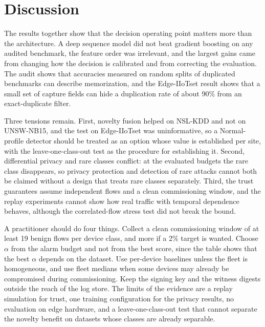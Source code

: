 \documentclass[journal]{IEEEtran}
\begin{document}
\begin{table}[t]
\centering
\caption{Per-round cost on one CPU thread.}
\label{tab:latency}
\scriptsize
\setlength{\tabcolsep}{2pt}
\resizebox{\columnwidth}{!}{}
\end{table}

\section{Discussion}\label{sec:discussion}
The results together show that the decision operating point matters more than the architecture. A deep sequence model did not beat gradient boosting on any audited benchmark, the feature order was irrelevant, and the largest gains came from changing how the decision is calibrated and from correcting the evaluation. The audit shows that accuracies measured on random splits of duplicated benchmarks can describe memorization, and the Edge-IIoTset result shows that a small set of capture fields can hide a duplication rate of about 90\% from an exact-duplicate filter.

Three tensions remain. First, novelty fusion helped on NSL-KDD and not on UNSW-NB15, and the test on Edge-IIoTset was uninformative, so a Normal-profile detector should be treated as an option whose value is established per site, with the leave-one-class-out test as the procedure for establishing it. Second, differential privacy and rare classes conflict: at the evaluated budgets the rare class disappears, so privacy protection and detection of rare attacks cannot both be claimed without a design that treats rare classes separately. Third, the trust guarantees assume independent flows and a clean commissioning window, and the replay experiments cannot show how real traffic with temporal dependence behaves, although the correlated-flow stress test did not break the bound.

A practitioner should do four things. Collect a clean commissioning window of at least 19 benign flows per device class, and more if a 2\% target is wanted. Choose $\alpha$ from the alarm budget and not from the best score, since the table shows that the best $\alpha$ depends on the dataset. Use per-device baselines unless the fleet is homogeneous, and use fleet medians when some devices may already be compromised during commissioning. Keep the signing key and the witness digests outside the reach of the log store. The limits of the evidence are a replay simulation for trust, one training configuration for the privacy results, no evaluation on edge hardware, and a leave-one-class-out test that cannot separate the novelty benefit on datasets whose classes are already separable.
\end{document}
